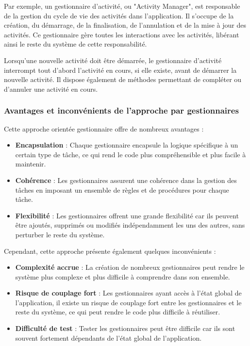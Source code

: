 Par exemple, un gestionnaire d'activité, ou "Activity Manager", est responsable de la gestion du cycle de vie des activités dans l'application. Il s'occupe de la création, du démarrage, de la finalisation, de l'annulation et de la mise à jour des activités. Ce gestionnaire gère toutes les interactions avec les activités, libérant ainsi le reste du système de cette responsabilité.

Lorsqu'une nouvelle activité doit être démarrée, le gestionnaire d'activité interrompt tout d'abord l'activité en cours, si elle existe, avant de démarrer la nouvelle activité. Il dispose également de méthodes permettant de compléter ou d'annuler une activité en cours.

\subsubsection{Avantages et inconvénients de l'approche par gestionnaires}

Cette approche orientée gestionnaire offre de nombreux avantages :

\begin{itemize}
    \item \textbf{Encapsulation} : Chaque gestionnaire encapsule la logique spécifique à un certain type de tâche, ce qui rend le code plus compréhensible et plus facile à maintenir.
    \item \textbf{Cohérence} : Les gestionnaires assurent une cohérence dans la gestion des tâches en imposant un ensemble de règles et de procédures pour chaque tâche.
    \item \textbf{Flexibilité} : Les gestionnaires offrent une grande flexibilité car ils peuvent être ajoutés, supprimés ou modifiés indépendamment les uns des autres, sans perturber le reste du système.
\end{itemize}

Cependant, cette approche présente également quelques inconvénients :

\begin{itemize}
    \item \textbf{Complexité accrue} : La création de nombreux gestionnaires peut rendre le système plus complexe et plus difficile à comprendre dans son ensemble.
    \item \textbf{Risque de couplage fort} : Les gestionnaires ayant accès à l'état global de l'application, il existe un risque de couplage fort entre les gestionnaires et le reste du système, ce qui peut rendre le code plus difficile à réutiliser.
    \item \textbf{Difficulté de test} : Tester les gestionnaires peut être difficile car ils sont souvent fortement dépendants de l'état global de l'application.
\end{itemize}

